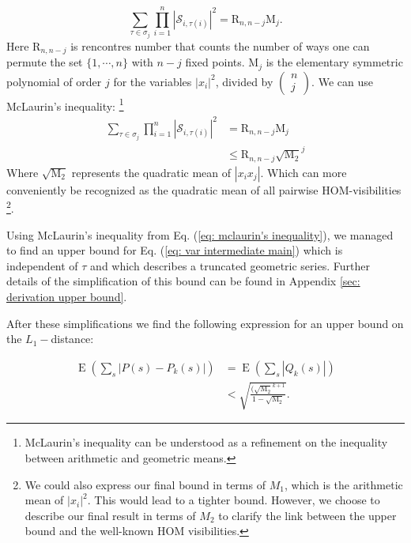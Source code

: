 \documentclass[10pt,aps,pra,twocolumn,superscriptaddress]{revtex4-2}
\DeclareMathOperator{\E}{E}
\begin{document}
\begin{equation}    \sum_{\tau\in\sigma_j}\prod^n_{i=1}|\mathcal{S}_{i,\tau(i)}|^2=\mathrm{R}_{n,n-j} \mathrm{M}_j.
    \label{eq: E[prod S]=prod E[x^2]}
\end{equation}
Here $\mathrm{R}_{n,n-j}$ is rencontres number that counts the number of ways one can permute the set $\{1,\cdots, n\}$ with $n-j$ fixed points. $\mathrm{M}_j$ is the elementary symmetric polynomial of order $j$ for the variables $|x_i|^2$, divided by $\begin{pmatrix}n\\j\end{pmatrix}$.
We can use McLaurin's inequality: \footnote{McLaurin's inequality can be understood as a refinement on the inequality between arithmetic and geometric means.}
\begin{equation}
\begin{split}
    \sum_{\tau\in\sigma_j}\prod^n_{i=1}|\mathcal{S}_{i,\tau(i)}|^2&=\mathrm{R}_{n,n-j} \mathrm{M}_j\\
    &\leq \mathrm{R}_{n,n-j} \sqrt{\mathrm{M}_2}^j
    \end{split}
    \label{eq: mclaurin's inequality}
\end{equation}
Where $\sqrt{\mathrm{M}_2}$ represents the quadratic mean of $|x_i x_j|$. Which can more conveniently be recognized as the quadratic mean of all pairwise HOM-visibilities \cite{hong1987measurement} \footnote{We could also express our final bound in terms of $M_1$, which is the arithmetic mean of $|x_i|^2$. This would lead to a tighter bound. However, we choose to describe our final result in terms of $M_2$ to clarify the link between the upper bound and the well-known HOM visibilities.}.

Using McLaurin's inequality from Eq. (\ref{eq: mclaurin's inequality}), we managed to find an upper bound for Eq. (\ref{eq: var intermediate main}) which is independent of $\tau$ and which describes a truncated geometric series. Further details of the simplification of this bound can be found in Appendix \ref{sec: derivation upper bound}.

After these simplifications we find the following expression for an upper bound on the $L_1-$distance:

\begin{align}
    \E\left(\sum_s|P(s)-P_k(s)|\right)&=\E\left(\sum_s|Q_k(s)|\right)\\
    &<\sqrt{\frac{( \sqrt{\mathrm{M}_2}^{k+1}}{1- \sqrt{\mathrm{M}_2}}}.
    \label{eq: upperbound general S main text}
\end{align}
\end{document}
